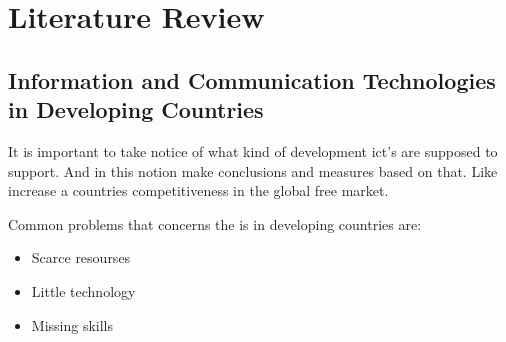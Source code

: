 \chapter{Literature Review}

\section{Information and Communication Technologies in Developing Countries}
It is important to take notice of what kind of development \gls{ict}'s are supposed to support.
And in this notion make conclusions and measures based on that.
Like increase a countries competitiveness in the global free market.




Common problems that concerns the \gls{is} in developing countries are:
\begin{itemize}
\item Scarce resourses
\item Little technology
\item Missing skills
\end{itemize}

